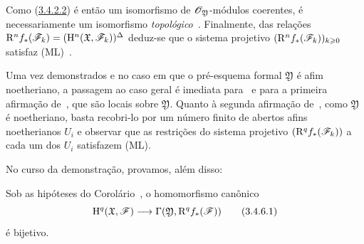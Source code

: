 \begin{env}[3.4.5]
Como (\hyperref[III.3.4.2.2]{3.4.2.2}) é então um isomorfismo de $\mathscr{O}_\mathfrak{Y}$-módulos coerentes, é necessariamente um isomorfismo \emph{topológico}~.
Finalmente, das relações $\mathrm{R}^n f_*(\mathscr{F}_k)=(\mathrm{H}^n(\mathfrak{X},\mathscr{F}_k))^\Delta$ deduz-se que o sistema projetivo $(\mathrm{R}^n f_*(\mathscr{F}_k))_{k\geqslant 0}$ satisfaz (ML)~.

Uma vez demonstrados  e  no caso em que o pré-esquema formal $\mathfrak{Y}$ é afim noetheriano, a passagem ao caso geral é imediata para~ e para a primeira afirmação de~, que são locais sobre $\mathfrak{Y}$.
Quanto à segunda afirmação de~, como $\mathfrak{Y}$ é noetheriano, basta recobri-lo por um número finito de abertos afins noetherianos $U_i$ e observar que as restrições do sistema projetivo $(\mathrm{R}^q f_*(\mathscr{F}_k))$ a cada um dos $U_i$ satisfazem (ML).
\end{env}

No curso da demonstração, provamos, além disso:
\begin{corollary}[3.4.6]
\label{III.3.4.6}
Sob as hipóteses do Corolário~, o homomorfismo canônico
\[
\label{III.3.4.6.1}
  \HH^q(\mathfrak{X},\sh{F})\to\Gamma(\mathfrak{Y},\RR^q f_*(\sh{F}))
  \tag{3.4.6.1}
\]
é bijetivo.
\end{corollary}
